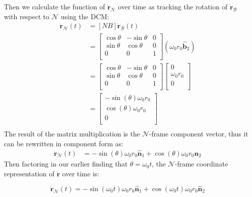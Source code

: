\documentclass[titlepage]{article}
\begin{document}
Then we calculate the function of $\dot{\boldsymbol{r}}_{\mathcal{N}}$ over time as tracking the rotation of $\dot{\boldsymbol{r}}_{\mathcal{B}}$ with respect to $\mathcal{N}$ using the DCM:
\begin{equation}
	\begin{split}
		\dot{\boldsymbol{r}}_{\mathcal{N}}(t)&=[NB]\dot{\boldsymbol{r}}_{\mathcal{B}}(t) \\
		&=
		\begin{bmatrix}
			\cos\theta & -\sin\theta & 0 \\
			\sin\theta & \cos\theta & 0 \\
			0 & 0 & 1 \\
		\end{bmatrix}\left(\omega_0 r_0\hat{\boldsymbol{b}}_2\right)\\
		&=
		\begin{bmatrix}
			\cos\theta & -\sin\theta & 0 \\
			\sin\theta & \cos\theta & 0 \\
			0 & 0 & 1 \\
		\end{bmatrix}
		\begin{bmatrix}
			0 \\
			\omega_0r_0 \\
			0 \\
		\end{bmatrix}\\
		&= 
		\begin{bmatrix}
			-\sin(\theta)\omega_0r_0 \\
			\cos(\theta)\omega_0r_0 \\
			0 \\
		\end{bmatrix}\\
	\end{split}
\end{equation}
The result of the matrix multiplication is the $\mathcal{N}$-frame component vector, thus it can be rewritten in component form as:
\begin{equation}
	\begin{split}
		\dot{\boldsymbol{r}}_{\mathcal{N}}(t)&=-\sin(\theta)\omega_0 r_0\hat{\boldsymbol{n}}_1+\cos(\theta)\omega_0 r_0\hat{\boldsymbol{n}}_2
	\end{split}
\end{equation}
Then factoring in our earlier finding that $\theta=\omega_0t$, the $\mathcal{N}$-frame coordinate representation of  $\boldsymbol{\dot{r}}$ over time is:
\begin{mdframed}[linewidth=1pt, innertopmargin=10pt, innerbottommargin=10pt]
	\begin{equation}
		\dot{\boldsymbol{r}}_{\mathcal{N}}(t)=-\sin(\omega_0t)\omega_0 r_0\hat{\boldsymbol{n}}_1+\cos(\omega_0t)\omega_0 r_0\hat{\boldsymbol{n}}_2
	\end{equation}
\end{mdframed}
\end{document}
